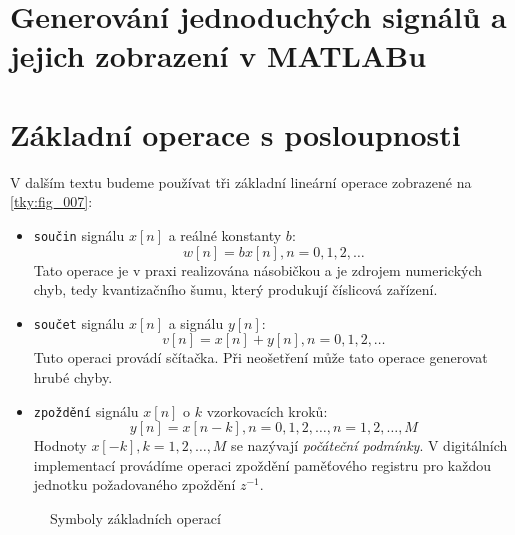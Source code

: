   \section{Generování jednoduchých signálů a jejich zobrazení v MATLABu}

  \section{Základní operace s posloupnosti}
    V dalším textu budeme používat tři základní lineární operace zobrazené na \ref{tky:fig_007}:
    \begin{itemize}
      \item \texttt{součin} signálu $x[n]$ a reálné konstanty $b$:
            $$w[n]=bx[n], n = 0,1,2, \ldots$$ Tato operace je v praxi realizována násobičkou a je
            zdrojem numerických chyb, tedy kvantizačního šumu, který produkují číslicová zařízení.
      \item \texttt{součet} signálu $x[n]$ a signálu $y[n]$:
            $$v[n]=x[n]+y[n], n = 0,1,2, \ldots$$ Tuto operaci provádí sčítačka. Při neošetření může
            tato operace generovat hrubé chyby.
      \item \texttt{zpoždění} signálu $x[n]$ o $k$ vzorkovacích kroků:  
            $$y[n]=x[n-k], n = 0,1,2, \ldots, n = 1,2, \ldots, M $$  Hodnoty $x[-k], k = 1, 2,
            \ldots, M$ se nazývají \emph{počáteční podmínky}. V digitálních implementací provádíme
            operaci zpoždění paměťového registru pro každou jednotku požadovaného zpoždění $z^{-1}$.
    \end{itemize}

    \begin{figure}[ht!]
      \centering
        \newline
      \caption[Základní operace]{Symboly základních operací \cite[s.~7]{Sovka2002}} 
      \label{ces:fig048}
    \end{figure}